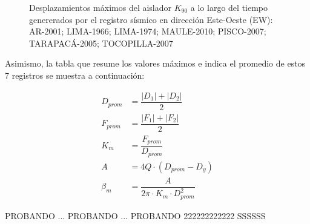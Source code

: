 \begin{figure}[H]
\begin{subfigure}[b]{0.99\linewidth}
  \caption{}
  \label{i4_2.7}
\end{subfigure}
    \caption[Desplazamientos máximos del aislador $K_{90}$ a lo largo del tiempo genererados por el registro sísmico en dirección Este-Oeste (EW)]{Desplazamientos máximos del aislador $K_{90}$ a lo largo del tiempo genererados por el registro sísmico en dirección Este-Oeste (EW):
     AR-2001;
     LIMA-1966;
     LIMA-1974;
     MAULE-2010;
     PISCO-2007;
     TARAPACÁ-2005;
     TOCOPILLA-2007
    }
    \label{i4_2}
\end{figure}

Asimismo, la tabla que resume los valores máximos e indica el promedio de estos 7 registros se muestra a continuación:

\begin{align*}
    D_{prom} &= \dfrac{|D_1| + |D_2|}{2} \\
    F_{prom} &= \dfrac{|F_1| + |F_2|}{2} \\
    K_m &= \dfrac{F_{prom}}{D_{prom}} \\
    A &= 4Q \cdot (D_{prom} - D_y) \\
    \beta_m &= \dfrac{A}{2\pi \cdot K_m \cdot D_{prom}^2}
\end{align*}

PROBANDO ... PROBANDO ... PROBANDO 222222222222
SSSSSS

